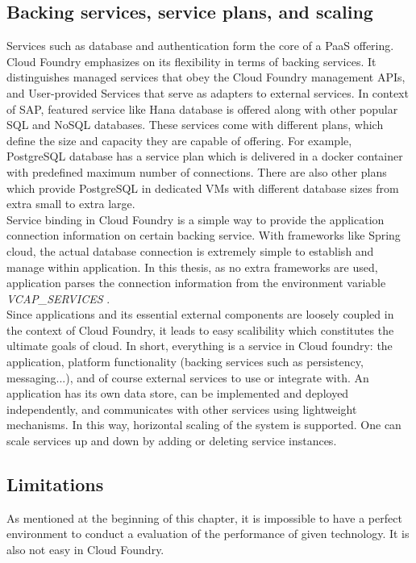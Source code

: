 \subsection{ Backing services, service plans, and scaling}
Services such as database and authentication form the core of a \ac{PaaS} offering. Cloud Foundry emphasizes on its flexibility in terms of backing services. It distinguishes managed services that obey the Cloud Foundry management APIs, and User-provided Services that serve as adapters to external services. In context of SAP, featured service like Hana database is offered along with other popular SQL and NoSQL databases. These services come with different plans, which define the size and capacity they are capable of offering. For example, PostgreSQL database has a service plan which is delivered in a docker container with predefined maximum number of connections. There are also other plans which provide PostgreSQL in dedicated VMs with different database sizes from extra small to extra large. \\
Service binding in Cloud Foundry is a simple way to provide the application connection information on certain backing service. With frameworks like Spring cloud, the actual database connection is extremely simple to establish and manage within application. In this thesis, as no extra frameworks are used, application parses the connection information from the environment variable \textit{VCAP\_SERVICES} . \\
Since applications and its essential external components are loosely coupled in the context of Cloud Foundry, it leads to easy scalibility which constitutes the ultimate goals of cloud.  In short, everything is a service in Cloud foundry: the application, platform functionality (backing services such as persistency, messaging...), and of course external services to use or integrate with. An application has its own data store, can be implemented and deployed independently, and communicates with other services using lightweight mechanisms.  In this way, horizontal scaling of the system is supported. One can scale services up and down by adding or deleting service instances.

\subsection{Limitations}
As mentioned at the beginning of this chapter, it is impossible to have a perfect environment to conduct a evaluation of the performance of given technology. It is also not easy in Cloud Foundry. \\

